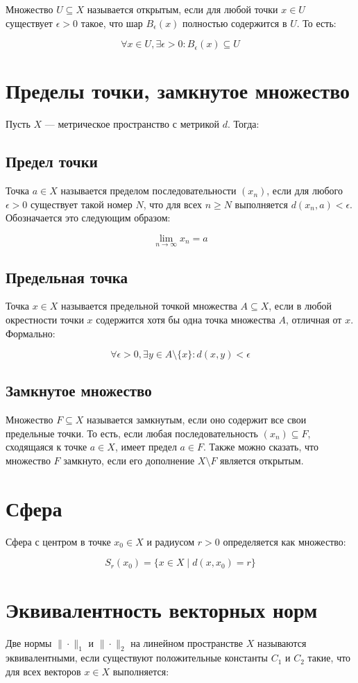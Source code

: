 \documentclass{article}
\begin{document}
Множество $U \subseteq X$ называется открытым, если для любой точки $x \in U$ существует $\epsilon > 0$ такое, что шар $B_\epsilon(x)$ полностью содержится в $U$. То есть:

\[
\forall x \in U, \exists \epsilon > 0: B_\epsilon(x) \subseteq U
\]
\section{Пределы точки, замкнутое множество}
Пусть $X$ — метрическое пространство с метрикой $d$. Тогда:
\subsection{Предел точки}

Точка $a \in X$ называется пределом последовательности $(x_n)$, если для любого $\epsilon > 0$ существует такой номер $N$, что для всех $n \geq N$ выполняется $d(x_n, a) < \epsilon$. Обозначается это следующим образом:

\[
\lim_{n \to \infty} x_n = a
\]
\subsection{Предельная точка}

Точка $x \in X$ называется предельной точкой множества $A \subseteq X$, если в любой окрестности точки $x$ содержится хотя бы одна точка множества $A$, отличная от $x$. Формально:

\[
\forall \epsilon > 0, \exists y \in A \setminus \{ x \}: d(x, y) < \epsilon
\]
\subsection{Замкнутое множество}

Множество $F \subseteq X$ называется замкнутым, если оно содержит все свои предельные точки. То есть, если любая последовательность $(x_n) \subseteq F$, сходящаяся к точке $a \in X$, имеет предел $a \in F$. Также можно сказать, что множество $F$ замкнуто, если его дополнение $X \setminus F$ является открытым.

\section{Сфера}

Сфера с центром в точке $x_0 \in X$ и радиусом $r > 0$ определяется как множество:

\[
S_r(x_0) = \{ x \in X \mid d(x, x_0) = r \}
\]
\section{Эквивалентность векторных норм}
Две нормы $\| \cdot \|_1$ и $\| \cdot \|_2$ на линейном пространстве $X$ называются эквивалентными, если существуют положительные константы $C_1$ и $C_2$ такие, что для всех векторов $x \in X$ выполняется:
\end{document}
